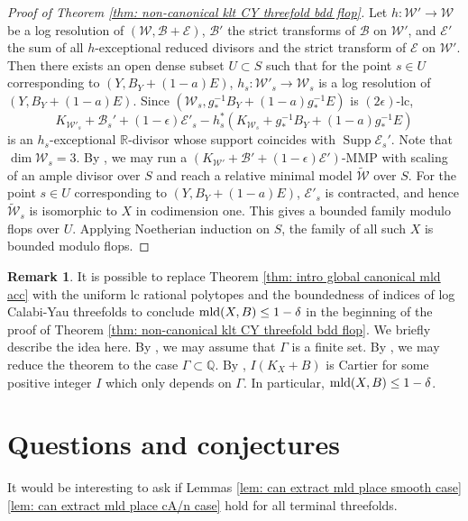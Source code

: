 \documentclass[11pt]{amsart}
\numberwithin{equation}{section}
\newcommand{\Qq}{\mathbb{Q}}
\newcommand{\Rr}{\mathbb{R}}
\newcommand{\mld}{{\rm{mld}}}
\newcommand{\Supp}{\operatorname{Supp}}
\newcommand{\Ii}{{\Gamma}}
\theoremstyle{definition}
\newtheorem{rem}[thm]{Remark}
\theoremstyle{definition}
\begin{document}
\begin{proof}[Proof of Theorem \ref{thm: non-canonical klt CY threefold bdd flop}]
Let $h: \mathcal{W}'\to \mathcal{W}$ be a log resolution of $(\mathcal{W},\mathcal{B}+\mathcal{E})$, $\mathcal{B}'$ the strict transforms of $\mathcal{B}$ on $\mathcal{W}'$, and $\mathcal{E}'$ the sum of all $h$-exceptional reduced divisors and the strict transform of $\mathcal{E}$ on $\mathcal{W}'$. Then there exists an open dense subset $U\subset S$ such that for the point $s\in U$ corresponding to $(Y,B_Y+(1-a)E)$, $h_s: \mathcal{W}'_s\to \mathcal{W}_s$ is a log resolution of $(Y,B_Y+(1-a)E)$. Since $(\mathcal{W}_s,g_*^{-1}B_Y+(1-a)g_*^{-1}E)$ is $(2\epsilon)$-lc, $$K_{\mathcal{W}'_s}+\mathcal{B}_s'+(1-\epsilon)\mathcal{E}'_s-h_s^*(K_{{\mathcal{W}_s}}+g_*^{-1}B_Y+(1-a)g_*^{-1}E)$$
is an $h_s$-exceptional $\Rr$-divisor whose support coincides with $\Supp \mathcal{E}_s'$. Note that $\dim \mathcal{W}_s=3$. By \cite[Lemma 2.10, Theorem 1.1]{HH20}, we may run a $(K_{\mathcal{W}'}+\mathcal{B}'+(1-\epsilon)\mathcal{E}')$-MMP with scaling of an ample divisor over $S$ and reach a relative minimal model $\tilde{\mathcal{W}}$ over $S$. For the point $s\in U$ corresponding to $(Y,B_Y+(1-a)E)$, $\mathcal{E}'_s$ is contracted, and hence $\tilde{\mathcal{W}}_s$ is isomorphic to $X$ in codimension one. This gives a bounded family modulo flops over $U$. Applying Noetherian induction on $S$, the family of all such $X$ is bounded modulo flops.
\end{proof}

\begin{rem}
It is possible to replace Theorem \ref{thm: intro global canonical mld acc} with the uniform lc rational polytopes \cite[Theorem 5.6]{HLS19} and the boundedness of indices of log Calabi-Yau threefolds \cite[Theorem 1.13]{Xu19} to conclude $\mld(X,B)\le 1-\delta$ in the beginning of the proof of Theorem \ref{thm: non-canonical klt CY threefold bdd flop}. We briefly describe the idea here. By \cite[Theorem 1.5]{HMX14}, we may assume that $\Ii$ is a finite set. By \cite[Theorem 5.6]{HLS19}, we may reduce the theorem to the case $\Ii\subset\Qq$. By \cite[Theorem 1.13]{Xu19}, $I(K_X+B)$ is Cartier for some positive integer $I$ which only depends on $\Ii$. In particular, $\mld(X,B)\le 1-\delta$. 
\end{rem}



\section{Questions and conjectures}

It would be interesting to ask if Lemmas \ref{lem: can extract mld place smooth case} \ref{lem: can extract mld place cA/n case} hold for all terminal threefolds.
\end{document}
